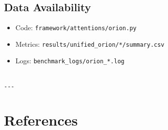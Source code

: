 \subsection{Data Availability}

\begin{itemize}
\item Code: \texttt{framework/attentions/orion.py}
\item Metrics: \texttt{results/unified\_orion/*/summary.csv}
\item Logs: \texttt{benchmark\_logs/orion\_*.log}
\end{itemize}
\begin{lstlisting}

---
\end{lstlisting}


\section{References}


